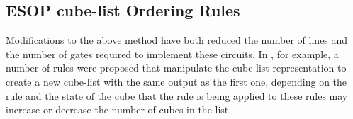 \subsection{ESOP cube-list Ordering Rules}


Modifications to the above method %
have both reduced the number of lines and the number of gates required to implement these circuits. %
In \cite{Nayeem2011}, for example, a number of rules were proposed that manipulate the cube-list representation to create a new cube-list with 
the same output as the first one, 
depending on the rule and the state of the cube that the rule is being applied to these rules may increase 
or decrease the number of cubes in the list.\\


